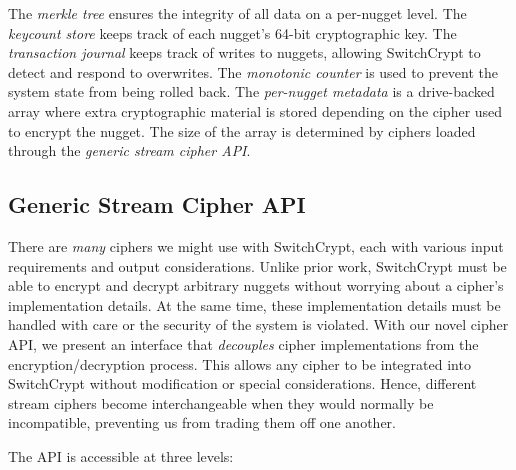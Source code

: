 The \emph{merkle tree} ensures the integrity of all data on a per-nugget level.
The \emph{keycount store} keeps track of each nugget's 64-bit cryptographic key.
The \emph{transaction journal} keeps track of writes to nuggets, allowing
SwitchCrypt to detect and respond to overwrites. The \emph{monotonic counter} is
used to prevent the system state from being rolled back. The \emph{per-nugget
metadata} is a drive-backed array where extra cryptographic material is stored
depending on the cipher used to encrypt the nugget. The size of the array is
determined by ciphers loaded through the \emph{generic stream cipher API}.

\subsection{Generic Stream Cipher API} \label{subsec:api}

There are \emph{many} ciphers we might use with SwitchCrypt, each with various
input requirements and output considerations. Unlike prior work, SwitchCrypt
must be able to encrypt and decrypt arbitrary nuggets without worrying about a
cipher's implementation details. At the same time, these implementation details
must be handled with care or the security of the system is violated. With our
novel cipher API, we present an interface that \emph{decouples} cipher
implementations from the encryption/decryption process. This allows any cipher
to be integrated into SwitchCrypt without modification or special
considerations. Hence, different stream ciphers become interchangeable when they
would normally be incompatible, preventing us from trading them off one another.

The API is accessible at three levels:

